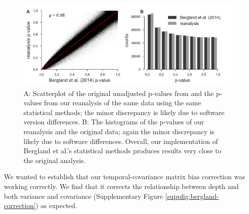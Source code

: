 \documentclass[11pt]{article}
\begin{document}
\begin{figure}[!ht]
  \centering
  \includegraphics[]{figures/bergland_pvalues.pdf}

  \caption{A: Scatterplot of the original unadjusted p-values from
    \textcite{Bergland2014-ij} and the p-values from our reanalysis of the same
    data using the same statistical methods; the minor discrepancy is likely due to software
    version differences. B: The histograms of the p-values of our reanalysis
    and the original \textcite{Bergland2014-ij} data; again the minor
    discrepancy is likely due to software differences. Overall, our
    implementation of Bergland et al.'s statistical methods produces results 
    very close to the original analysis.}

  \label{suppfig:bergland-pvalue-comparison}
\end{figure}

We wanted to establish that our temporal-covariance matrix bias correction was
working correctly. We find that it corrects the relationship between depth and
both variance and covariance (Supplementary Figure
\ref{suppfig:bergland-correction}) as expected.
\end{document}
